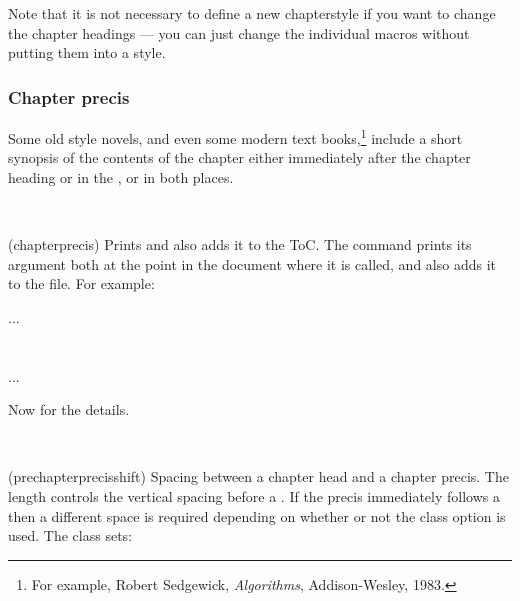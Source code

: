 Note that it is not necessary to define a new chapterstyle if you want
to change the chapter headings --- you can just change the individual
macros without putting them into a style.




\subsection{Chapter precis}
\label{sec:chapter-precis}



   Some old style novels, and even some modern text 
 books,\footnote{For example, Robert Sedgewick, \textit{Algorithms},
 Addison-Wesley, 1983.} include a short synopsis of the contents of 
 the chapter either immediately
 after the chapter heading or in the \toc, or in both places.

\begin{syntax}
\cmd{\chapterprecis} \\
\end{syntax}
\glossary(chapterprecis)%
  {}%
  {Prints  and also adds it to the ToC.}
     The command \cmd{\chapterprecis} prints its argument 
 both at the
 point in the document where it is called, and also adds it to the 
 file. For example:
 \begin{lcode}
 ...
 \chapter{}%
 ...
 \end{lcode}

    Now for the details.

\begin{syntax}
\lnc{\prechapterprecisshift} \\
\end{syntax}
\glossary(prechapterprecisshift)%
  {}%
  {Spacing between a chapter head and a chapter precis.}
The length \lnc{\prechapterprecisshift} controls the vertical spacing before
a \cmd{\chapterprecis}. If the precis immediately follows a \cmd{\chapter}
then a different space is required depending on whether or not the
 class option is used. The class sets:
\begin{lcode}
\ifartopt
  \setlength{\prechapterprecisshift}{0pt}
\else
  \setlength{\prechapterprecisshift}{-2\baselineskip}
\fi
\end{lcode}


